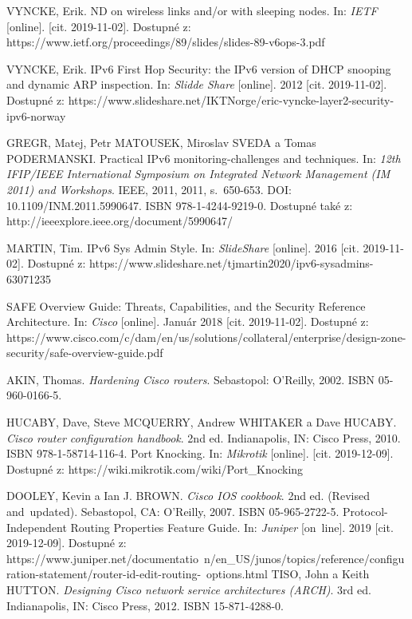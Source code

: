 \begin{literatura}{99}
VYNCKE, Erik. ND on wireless links and/or with sleeping nodes. In: \textit{IETF} [online]. [cit. 2019-11-02]. Dostupné z: https://www.ietf.org/proceedings/89/slides/slides-89-v6ops-3.pdf




VYNCKE, Erik. IPv6 First Hop Security: the IPv6 version of DHCP snooping and dynamic ARP inspection. In: \textit{Slidde Share} [online]. 2012 [cit. 2019-11-02]. Dostupné z: https://www.slideshare.net/IKTNorge/eric-vyncke-layer2-security-ipv6-norway


GREGR, Matej, Petr MATOUSEK, Miroslav SVEDA a Tomas PODERMANSKI. Practical IPv6 monitoring-challenges and techniques. In: \textit{12th IFIP/IEEE International Symposium on Integrated Network Management (IM 2011) and Workshops}. IEEE, 2011, 2011, s.~650-653. DOI: 10.1109/INM.2011.5990647. ISBN 978-1-4244-9219-0. Dostupné také z: http://ieeexplore.ieee.org/document/5990647/




MARTIN, Tim. IPv6 Sys Admin Style. In: \textit{SlideShare} [online]. 2016 [cit. 2019-11-02]. Dostupné z: https://www.slideshare.net/tjmartin2020/ipv6-sysadmins-63071235

SAFE Overview Guide: Threats, Capabilities, and the Security Reference Architecture. In: \textit{Cisco} [online]. Január 2018 [cit. 2019-11-02]. Dostupné z: https://www.cisco.com/c/dam/en/us/solutions/collateral/enterprise/design-zone-security/safe-overview-guide.pdf

AKIN, Thomas. \textit{Hardening Cisco routers}. Sebastopol: O'Reilly, 2002. ISBN 05-960-0166-5.

HUCABY, Dave, Steve MCQUERRY, Andrew WHITAKER a Dave HUCABY. \textit{Cisco router configuration handbook}. 2nd ed. Indianapolis, IN: Cisco Press, 2010. ISBN 978-1-58714-116-4.
Port Knocking. In: \textit{Mikrotik} [online]. [cit. 2019-12-09]. Dostupné z: https://wiki.mikrotik.com/wiki/Port\_Knocking



DOOLEY, Kevin a Ian J. BROWN. \textit{Cisco IOS cookbook}. 2nd ed. (Revised and\
updated). Sebastopol, CA: O'Reilly, 2007. ISBN 05-965-2722-5.
Protocol-Independent Routing Properties Feature Guide. In: \textit{Juniper} [on\
line]. 2019 [cit. 2019-12-09]. Dostupné z: https://www.juniper.net/documentatio\
n/en\_US/junos/topics/reference/configuration-statement/router-id-edit-routing-\
options.html
\bibitem{Tiso2012}
TISO, John a Keith HUTTON. \textit{Designing Cisco network service architectures (ARCH)}. 3rd ed. Indianapolis, IN: Cisco Press, 2012. ISBN 15-871-4288-0.


\end{literatura}
